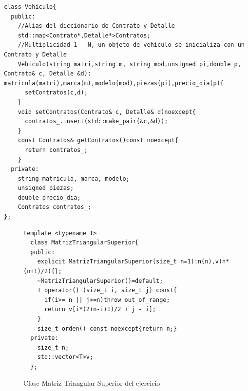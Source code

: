 \begin{enumerate}[label =\alph*)]
\begin{verbatim}
class Vehiculo{
  public:
    //Alias del diccionario de Contrato y Detalle
    std::map<Contrato*,Detalle*>Contratos;
    //Multiplicidad 1 - N, un objeto de vehiculo se inicializa con un Contrato y Detalle
    Vehiculo(string matri,string m, string mod,unsigned pi,double p, Contrato& c, Detalle &d): matricula(matri),marca(m),modelo(mod),piezas(pi),precio_dia(p){
      setContratos(c,d);
    }
    void setContratos(Contrato& c, Detalle& d)noexcept{
      contratos_.insert(std::make_pair(&c,&d));
    }
    const Contratos& getContratos()const noexcept{
      return contratos_;
    }
  private:
    string matricula, marca, modelo;
    unsigned piezas;
    double precio_dia;
    Contratos contratos_;
};

\end{verbatim}
\end{enumerate}
\begin{figure}[ht]
  \begin{center}
    \begin{lstlisting}[frame = single]
  template <typename T>
  class MatrizTriangularSuperior{
  public:
    explicit MatrizTriangularSuperior(size_t n=1):n(n),v(n*(n+1)/2){};
    ~MatrizTriangularSuperior()=default;
    T operator() (size_t i, size_t j) const{
      if(i>= n || j>=n)throw out_of_range;
      return v[i*(2+n-i+1)/2 + j - i];
    }
    size_t orden() const noexcept{return n;}
  private:
    size_t n;
    std::vector<T>v;
  };
    \end{lstlisting}
  \end{center}
  \caption{Clase Matriz Triangular Superior del ejercicio}
\end{figure}

